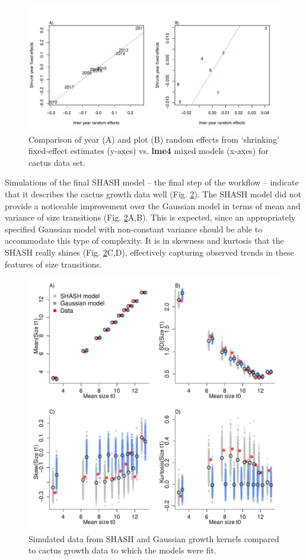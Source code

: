 \documentclass[12pt]{article}
\begin{document}
\begin{figure}
\centering
\includegraphics[width=\textwidth]{figures/cactus_rfx_compare}
\caption{Comparison of year (A) and plot (B) random effects from `shrinking' fixed-effect estimates (y-axes) vs. \textbf{lme4} mixed models (x-axes) for cactus data set.}
\label{fig:cactus_rfx_compare}
\end{figure} 

Simulations of the final SHASH model -- the final step of the workflow -- indicate that it describes the cactus growth data well (Fig. \ref{fig:cactus_sim_moments}). 
The SHASH model did not provide a noticeable improvement over the Gaussian model in terms of mean and variance of size transitions (Fig. \ref{fig:cactus_sim_moments}A,B).
This is expected, since an appropriately specified Gaussian model with non-constant variance should be able to accommodate this type of complexity.
It is in skewness and kurtosis that the SHASH really shines (Fig. \ref{fig:cactus_sim_moments}C,D), effectively capturing observed trends in these features of size transitions. 

\begin{figure}
\centering
\includegraphics[width=\textwidth]{figures/cactus_sim_moments}
\caption{Simulated data from SHASH and Gaussian growth kernels compared to cactus growth data to which the models were fit.}
\label{fig:cactus_sim_moments}
\end{figure} 
\end{document}
